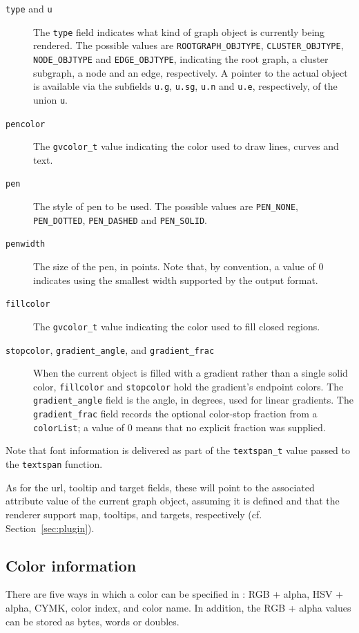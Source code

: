\begin{description}
\item[{\tt type} and {\tt u}]
The {\tt type} field indicates what kind of graph object is currently
being rendered. The possible values are 
{\tt ROOTGRAPH\_OBJTYPE}, {\tt CLUSTER\_OBJTYPE},
{\tt NODE\_OBJTYPE} and {\tt EDGE\_OBJTYPE},
indicating the root graph, a cluster subgraph, a node and an edge,
respectively.
A pointer to the actual object is available via the subfields
{\tt u.g}, {\tt u.sg}, {\tt u.n} and {\tt u.e}, respectively, 
of the union {\tt u}.
\item[{\tt pencolor}]
The {\tt gvcolor\_t} value indicating the color used to draw lines,
curves and text.
\item[{\tt pen}]
The style of pen to be used. The possible values are
{\tt PEN\_NONE}, {\tt PEN\_DOTTED},
{\tt PEN\_DASHED} and {\tt PEN\_SOLID}.
\item[{\tt penwidth}]
The size of the pen, in points.
Note that, by convention, a value of 0 indicates using the smallest
width supported by the output format.
\item[{\tt fillcolor}]
The {\tt gvcolor\_t} value indicating the color used to fill
closed regions.
\item[{\tt stopcolor}, {\tt gradient\_angle}, and {\tt gradient\_frac}]
When the current object is filled with a gradient rather than a single
solid color, {\tt fillcolor} and {\tt stopcolor} hold the gradient's
endpoint colors. The {\tt gradient\_angle} field is the angle, in degrees,
used for linear gradients. The {\tt gradient\_frac} field records the
optional color-stop fraction from a {\tt colorList}; a value of 0 means
that no explicit fraction was supplied.
\end{description}
Note that font information is delivered as part of the 
{\tt textspan\_t} value passed to the {\tt textspan} function.

As for the url, tooltip and target fields, these will point to
the associated attribute value of the current graph object,
assuming it is defined and that the renderer support map, tooltips,
and targets, respectively (cf. Section~\ref{sec:plugin}).

\subsection{Color information}
\label{sec:color}

There are five ways in which a color can be specified in \gviz:
RGB + alpha, HSV + alpha, CYMK, color index, and color name.
In addition, the RGB + alpha values can be stored as bytes, words
or doubles.

